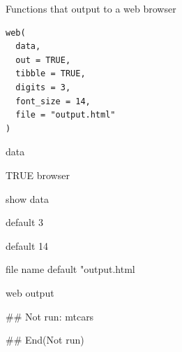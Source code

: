 \documentclass[a4paper]{book}
\begin{document}
%
\begin{Description}
Functions that output to a web browser
\end{Description}
%
\begin{Usage}
\begin{verbatim}
web(
  data,
  out = TRUE,
  tibble = TRUE,
  digits = 3,
  font_size = 14,
  file = "output.html"
)
\end{verbatim}
\end{Usage}
%
\begin{Arguments}
\begin{ldescription}
\item[\code{data}] data

\item[\code{out}] TRUE browser

\item[\code{tibble}] show data

\item[\code{digits}] default 3

\item[\code{font\_size}] default 14

\item[\code{file}] file name default "output.html
\end{ldescription}
\end{Arguments}
%
\begin{Value}
web output
\end{Value}
%
\begin{Examples}
\begin{ExampleCode}

\#\# Not run: 
mtcars%


## End(Not run)

\end{ExampleCode}
\end{Examples}
\end{document}
